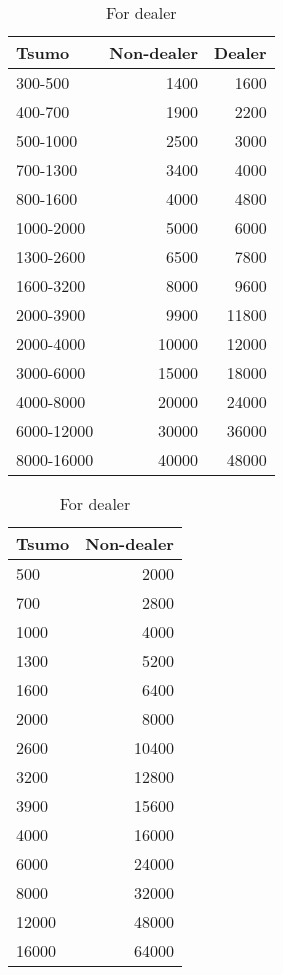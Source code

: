 {\begin{table}[h!]
\centering\captionsetup{font=small}\small
\begin{minipage}[h]{0.49\hsize}
\caption{For non-dealer} \label{tbl:pd5}
\begin{tabular}{l r r}
\toprule
{ Tsumo} & {\footnotesize Non-dealer} & {\footnotesize Dealer}\\
\midrule
300-500 &	1400	& 1600\\
400-700 &	1900	&2200\\
500-1000&2500&3000\\
700-1300&3400&4000\\
800-1600&4000&4800\\
1000-2000&5000&6000\\
1300-2600&6500&7800\\
1600-3200&8000&9600\\
2000-3900&9900&11800\\
2000-4000&10000&12000\\
3000-6000&15000&18000\\
4000-8000&20000&24000\\
6000-12000&30000&36000\\
8000-16000&40000&48000\\
\bottomrule
\end{tabular}
\end{minipage}
    \hfill
\begin{minipage}[h]{0.49\hsize}\centering
\caption{For dealer} \label{tbl:pd6}
\begin{tabular}{l r}
\toprule
{Tsumo} & {\footnotesize Non-dealer} \\
\midrule
500&	2000\\
700&	2800\\
1000&4000\\
1300&5200\\
1600&6400\\
2000&8000\\
2600&10400\\
3200&12800\\
3900&15600\\
4000&16000\\
6000&24000\\
8000&32000\\
12000&48000\\
16000&64000\\
\bottomrule
\end{tabular}
\end{minipage}
\end{table}}

